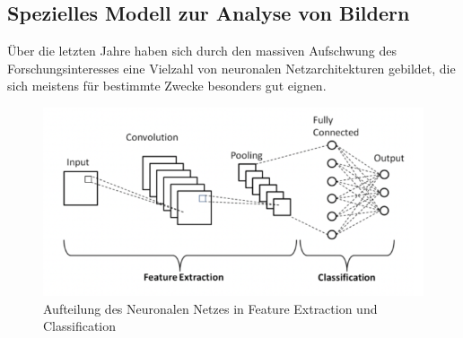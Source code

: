 \subsection{Spezielles Modell zur Analyse von Bildern}
Über die letzten Jahre haben sich durch den massiven Aufschwung des Forschungsinteresses eine Vielzahl von neuronalen Netzarchitekturen gebildet, die sich meistens für bestimmte Zwecke besonders gut eignen.
\begin{figure}
    \centering
    \includegraphics[width=1\linewidth]{1_-FR6rFrKXktjxwDTlGofPQ.png}
    \caption{Aufteilung des Neuronalen Netzes in Feature Extraction und Classification}
    \label{fig:enter-label}
\end{figure}